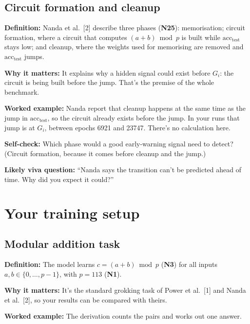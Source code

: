 \documentclass[11pt,a4paper,oneside,openany]{report}
\newcommand{\acctest}{\mathrm{acc}_{\mathrm{test}}}
\newcommand{\gl}[1]{\textbf{#1}}   %
\newcommand{\fdef}{\textbf{Definition:} }
\newcommand{\fwhy}{\par\textbf{Why it matters:} }
\newcommand{\fex}{\par\textbf{Worked example:} }
\newcommand{\fself}{\par\textbf{Self-check:} }
\newcommand{\fviva}{\par\textbf{Likely viva question:} }
\begin{document}
\section{Circuit formation and cleanup}
\fdef Nanda et al.\ [2] describe three phases (\gl{N25}): memorisation; circuit formation, where a circuit that computes $(a+b) \bmod p$ is built while $\acctest$ stays low; and cleanup, where the weights used for memorising are removed and $\acctest$ jumps.
\fwhy It explains why a hidden signal could exist before $G_i$: the circuit is being built before the jump. That's the premise of the whole benchmark.
\fex Nanda report that cleanup happens at the same time as the jump in $\acctest$, so the circuit already exists before the jump. In your runs that jump is at $G_i$, between epochs 6921 and 23747. There's no calculation here.
\fself Which phase would a good early-warning signal need to detect? (Circuit formation, because it comes before cleanup and the jump.)
\fviva ``Nanda says the transition can't be predicted ahead of time. Why did you expect it could?''

\chapter{Your training setup}

\section{Modular addition task}
\fdef The model learns $c = (a + b) \bmod p$ (\gl{N3}) for all inputs $a, b \in \{0, \ldots, p-1\}$, with $p = 113$ (\gl{N1}).
\fwhy It's the standard grokking task of Power et al.\ [1] and Nanda et al.\ [2], so your results can be compared with theirs.
\fex The derivation counts the pairs and works out one answer.
\end{document}
